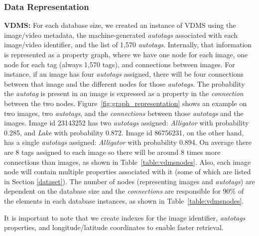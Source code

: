 \subsubsection{Data Representation}

\textbf{VDMS:}
For each database size, we created an instance of VDMS using the image/video metadata,
the machine-generated \textit{autotags} associated with
each image/video identifier, and the list of 1,570 \textit{autotags}.
Internally, that information is represented as a property graph,
where we have one node for each image, one node for each tag
(always 1,570 tags), and connections between images.
For instance, if an image has four \textit{autotags} assigned,
there will be four connections between that image and
the different nodes for those \textit{autotags}.
The probability the \textit{autotag} is present in an image
is expressed as a property in the \textit{connection} between the two nodes.
Figure~\ref{fig:graph_representation} shows an example on two images,
two \textit{autotags}, and the \textit{connections} between
those \textit{autotags} and the images.
Image id 23143252 has two \textit{autotags} assigned:
\textit{Alligator} with probability 0.285, and \textit{Lake} with probability 0.872.
Image id 86756231, on the other hand, has a single \textit{autotags} assigned:
\textit{Alligator} with probability 0.894.
On average there are 8 tags assigned to each image so
there will be around 8 times more connections than images, as shown
in Table~\ref{table:vdmsnodes}.
Also, each image node will contain multiple properties associated
with it (some of which are listed in Section \ref{dataset}). 
The number of nodes (representing images and \textit{autotags}) 
are dependent on the database size and the \textit{connections} are responsible for
90\% of the elements in each database instances,  
as shown in Table~\ref{table:vdmsnodes}.

It is important to note that we create indexes for the image identifier,
\textit{autotags} properties, and longitude/latitude coordinates 
to enable faster retrieval.

